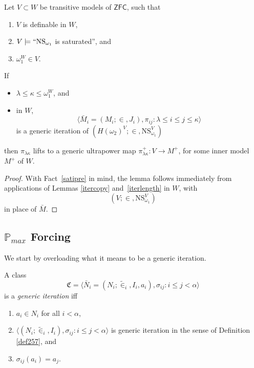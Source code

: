 \documentclass[12pt]{article}
\numberwithin{equation}{section}
\begin{document}
\begin{lem}\label{lift}
Let $V \subset W$ be transitive models of $\mathsf{ZFC}$, such that 
\begin{enumerate}[label=(\arabic*)]
    \item $V$ is definable in $W$,
    \item $V \models ``\mathrm{NS}_{\omega_1}$ is saturated'', and
    \item $\omega_1^W \in V$.
\end{enumerate}
If 
\begin{itemize}
    \item $\lambda \leq \kappa \leq \omega_1^W$, and
    \item in $W$, $$\langle \bar{M}_i = (M_i; \in, J_i), \pi_{ij} : \lambda \leq i \leq j \leq \kappa \rangle$$ is a generic iteration of $(H(\omega_2)^V; \in, \mathrm{NS}_{\omega_1}^V)$
\end{itemize}
then $\pi_{\lambda \kappa}$ lifts to a generic ultrapower map $\pi^{+}_{\lambda \kappa} : V \longrightarrow M^+$, for some inner model $M^+$ of $W$.
\end{lem}
\begin{proof}
With Fact~\ref{satipre} in mind, the lemma follows immediately from applications of Lemmas \ref{itercopy} and~\ref{iterlength} in $W$, with $$(V; \in, \mathrm{NS}_{\omega_1}^V)$$ in place of $\bar{M}$.
\end{proof}

\subsection{\texorpdfstring{$\mathbb{P}_{max}$}{P-max} Forcing}\label{ss27}

We start by overloading what it means to be a generic iteration.

\begin{defi}\label{def269}
A class
\begin{equation*}
    \mathfrak{C} = \langle \bar{N}_i = (N_i; \tilde{\in}_i, I_i, a_i), \sigma_{ij} : i \leq j < \alpha \rangle
\end{equation*}
is a \emph{generic iteration} iff
\begin{enumerate}[label=(\alph*)]
    \item $a_i \in N_i$ for all $i < \alpha$,
    \item $\langle (N_i; \tilde{\in}_i, I_i), \sigma_{ij} : i \leq j < \alpha \rangle$ is generic iteration in the sense of Definition \ref{def257}, and
    \item $\sigma_{ij}(a_i) = a_j$.
\end{enumerate}
\end{defi}
\end{document}
